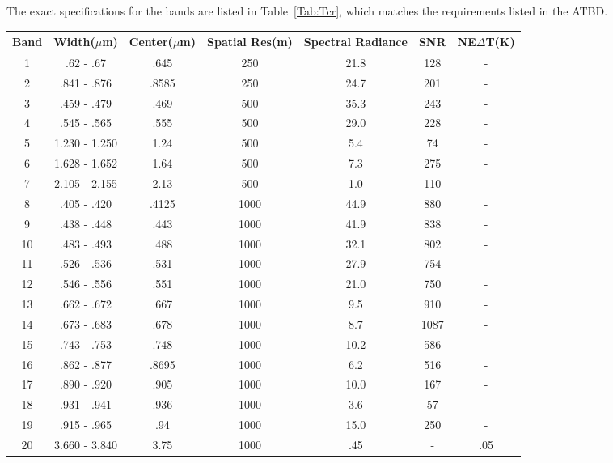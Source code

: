 \documentclass[12pt, letterpaper]{article}
\begin{document}
\begin{enumerate}
    The exact specifications for the bands are listed in Table~\ref{Tab:Tcr}, which matches the requirements listed in the ATBD. 
    \begin{center}
    \pagebreak
    { %
    \begin{tabular}{| c | c | c | c | c | c | c | }
        \hline
        Band & Width($\mu$m) & Center($\mu$m) & Spatial Res(m) & Spectral Radiance & SNR & NE$\Delta$T(K) \\ [.5ex]
        \hline
        1 & .62 - .67 & .645 & 250 & 21.8 & 128 & -  \\
        2 & .841 - .876 & .8585 & 250 & 24.7 & 201 & -  \\
        \hline
        3 & .459 - .479 & .469 & 500 & 35.3 & 243 & -  \\
        4 & .545 - .565 & .555 & 500 & 29.0 & 228 & - \\
        5 & 1.230 - 1.250 & 1.24 & 500 & 5.4 & 74 & - \\
        6 & 1.628 - 1.652 & 1.64 & 500 & 7.3 & 275 & - \\
        7 & 2.105 - 2.155 & 2.13 & 500 & 1.0  & 110 & - \\
        \hline
        8 & .405 - .420 & .4125 & 1000 & 44.9 & 880 & - \\
        9 & .438 - .448 & .443 & 1000 & 41.9 & 838 & - \\
        10 & .483 - .493 & .488 & 1000 & 32.1 & 802 & - \\
        11 & .526 - .536 & .531 & 1000 & 27.9 & 754 & - \\
        12 & .546 - .556 & .551 & 1000 & 21.0 & 750 & - \\
        13 & .662 - .672 & .667 & 1000 & 9.5 & 910 & - \\
        14 & .673 - .683 & .678 & 1000 & 8.7 & 1087 & - \\
        15 & .743 - .753 & .748 & 1000 & 10.2 & 586 & - \\ 
        16 & .862 - .877 & .8695 & 1000 & 6.2 & 516 & - \\
        \hline
        17 & .890 - .920 & .905 & 1000 & 10.0 & 167 & - \\
        18 & .931 - .941 & .936 & 1000 & 3.6 & 57 & - \\
        \hline
        19 & .915 - .965 & .94 & 1000 & 15.0 & 250 & - \\
        20 & 3.660 - 3.840 & 3.75 & 1000 & .45 & - & .05 \\

\end{tabular}}
\end{center}
\end{enumerate}
\end{document}
